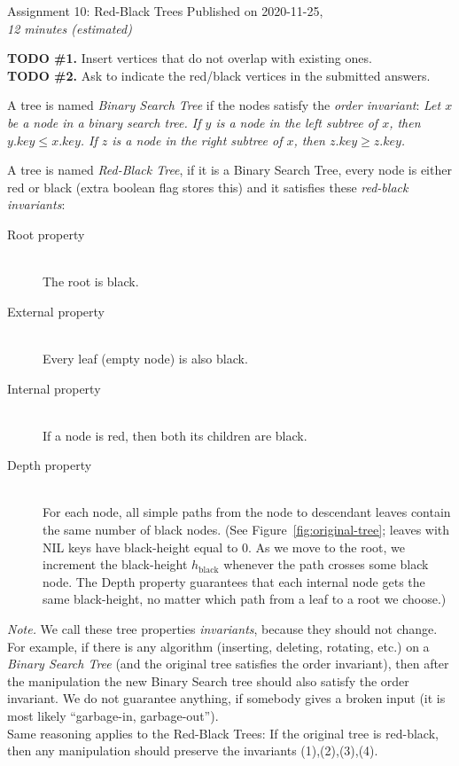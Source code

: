 \documentclass[a4paper,12pt]{article}
\begin{document}

\thispagestyle{empty}

\begin{center}
{\Large Assignment 10: Red-Black Trees}
{\Large Published on 2020-11-25,}\\
{\em 12 minutes (estimated)} 
\end{center}

\noindent

{\bf TODO \#1.} Insert vertices that do not overlap with existing ones.\\
{\bf TODO \#2.} Ask to indicate the red/black vertices in the submitted answers.

A tree is named {\em Binary Search Tree} if the nodes satisfy the {\em order invariant}:
{\em Let $x$ be a node in a binary search tree. If $y$ is a node in the left subtree
of $x$, then $y.key \leq x.key$. If $z$ is a node in the right subtree of $x$, then
$z.key \geq z.key$.}

\vspace{10pt} A tree is named {\em Red-Black Tree}, if it is a Binary Search Tree, 
every node is either red or black (extra boolean flag stores this) and 
it satisfies these {\em red-black invariants}:
\begin{description}
\item[Root property] \hfill \\ The root is black.
\item[External property] \hfill \\ Every leaf (empty node) is also black.
\item[Internal property] \hfill \\  If a node is red, then both its children are black.
\item[Depth property] \hfill \\ For each node, all simple paths from the node to descendant leaves contain the
same number of black nodes. (See Figure~\ref{fig:original-tree}; leaves with NIL keys have 
black-height equal to $0$. As we move to the root, we increment 
the black-height $h_\text{black}$ whenever the path crosses some black node. 
The Depth property guarantees that each internal node gets the same black-height, no matter
which path from a leaf to a root we choose.)

\end{description}


{\em Note.} We call these tree properties {\em invariants}, because they should not change. 
For example, if there is any algorithm (inserting, deleting, rotating, etc.) on a {\em Binary Search Tree}
(and the original tree satisfies the order invariant), then after the manipulation the new 
Binary Search tree should also satisfy the order invariant.
We do not guarantee anything, if somebody gives a broken input (it is most likely 
``garbage-in, garbage-out'').\\
Same reasoning applies to the Red-Black Trees: If the original tree is red-black, then 
any manipulation should preserve the invariants (1),(2),(3),(4).
\end{document}
